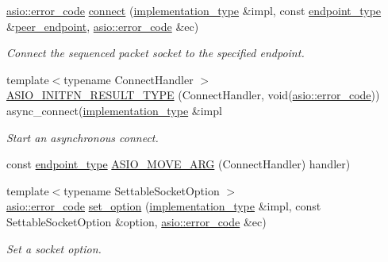 \begin{DoxyCompactItemize}
\hyperlink{classasio_1_1error__code}{asio\+::error\+\_\+code} \hyperlink{classasio_1_1seq__packet__socket__service_a4e2b4fa519525bd4380026c8f93a0a6e}{connect} (\hyperlink{classasio_1_1seq__packet__socket__service_a6e1d2027450d7a5d8ea7896a3de0c8ff}{implementation\+\_\+type} \&impl, const \hyperlink{classasio_1_1seq__packet__socket__service_ade8f7b83e2a45da7bbdc473deaf25075}{endpoint\+\_\+type} \&\hyperlink{classasio_1_1seq__packet__socket__service_a4423f9f6b399d358e6ff2856662765c1}{peer\+\_\+endpoint}, \hyperlink{classasio_1_1error__code}{asio\+::error\+\_\+code} \&ec)
\begin{DoxyCompactList}\small\item\em Connect the sequenced packet socket to the specified endpoint. \end{DoxyCompactList}\item 
{\footnotesize template$<$typename Connect\+Handler $>$ }\\\hyperlink{classasio_1_1seq__packet__socket__service_aaf749716bd399b69a4e64a56be342f2e}{A\+S\+I\+O\+\_\+\+I\+N\+I\+T\+F\+N\+\_\+\+R\+E\+S\+U\+L\+T\+\_\+\+T\+Y\+P\+E} (Connect\+Handler, void(\hyperlink{classasio_1_1error__code}{asio\+::error\+\_\+code})) async\+\_\+connect(\hyperlink{classasio_1_1seq__packet__socket__service_a6e1d2027450d7a5d8ea7896a3de0c8ff}{implementation\+\_\+type} \&impl
\begin{DoxyCompactList}\small\item\em Start an asynchronous connect. \end{DoxyCompactList}\item 
const \hyperlink{classasio_1_1seq__packet__socket__service_ade8f7b83e2a45da7bbdc473deaf25075}{endpoint\+\_\+type} \hyperlink{classasio_1_1seq__packet__socket__service_ab9bb6483d15af2e3f08b9051a4681923}{A\+S\+I\+O\+\_\+\+M\+O\+V\+E\+\_\+\+A\+R\+G} (Connect\+Handler) handler)
\item 
{\footnotesize template$<$typename Settable\+Socket\+Option $>$ }\\\hyperlink{classasio_1_1error__code}{asio\+::error\+\_\+code} \hyperlink{classasio_1_1seq__packet__socket__service_a0b2b56e41cedca9710ce0a6f58917e67}{set\+\_\+option} (\hyperlink{classasio_1_1seq__packet__socket__service_a6e1d2027450d7a5d8ea7896a3de0c8ff}{implementation\+\_\+type} \&impl, const Settable\+Socket\+Option \&option, \hyperlink{classasio_1_1error__code}{asio\+::error\+\_\+code} \&ec)
\begin{DoxyCompactList}\small\item\em Set a socket option. \end{DoxyCompactList}\item 

\end{DoxyCompactItemize}

